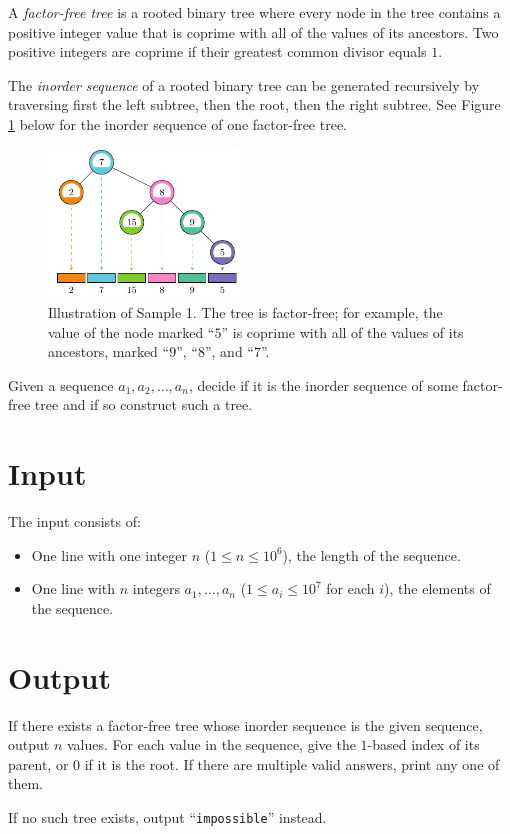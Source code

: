 
A \emph{factor-free tree} is a rooted binary tree where every node in the tree
contains a positive integer value that is coprime with all of the values of its
ancestors. Two positive integers are coprime if their greatest common divisor equals $1$.

The \emph{inorder sequence} of a rooted binary tree can be generated recursively by
traversing first the left subtree, then the root, then the right subtree.
See Figure \ref{fig:inorder} below for the inorder sequence of one
factor-free tree.
\begin{figure}[h!]
  \centering
  \includegraphics[width=0.45\textwidth]{sample1}
  \caption{Illustration of Sample 1. The tree is factor-free; for example, the value of the node marked ``$5$'' is coprime with all of the values of its ancestors, marked ``$9$'', ``$8$'', and ``$7$''.}
  \label{fig:inorder}
\end{figure}

Given a sequence $a_1, a_2, \ldots, a_n$, decide if it is the inorder
sequence of some factor-free tree and if so construct such a tree.

\section*{Input}
The input consists of:
\begin{itemize}
  \item One line with one integer $n$ ($1 \leq n \leq 10^6$), the length of the sequence.
  \item One line with $n$ integers $a_1, \ldots, a_n$ ($1 \leq a_i \leq 10^7$ for each $i$), the elements of the sequence.
\end{itemize}

\section*{Output}
If there exists a factor-free tree whose inorder sequence is the given sequence, output $n$ values.
For each value in the sequence, give the $1$-based index of its parent, or $0$
if it is the root.
If there are multiple valid answers, print any one of them.

If no such tree exists, output ``\texttt{impossible}'' instead.
